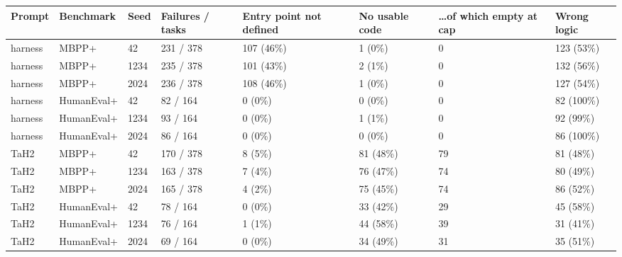 \begin{tabular}{llllllll}
\toprule
Prompt & Benchmark & Seed & Failures / tasks & Entry point not defined & No usable code & …of which empty at cap & Wrong logic \\
\midrule
harness & MBPP+ & 42 & 231 / 378 & 107 (46\%) & 1 (0\%) & 0 & 123 (53\%) \\
harness & MBPP+ & 1234 & 235 / 378 & 101 (43\%) & 2 (1\%) & 0 & 132 (56\%) \\
harness & MBPP+ & 2024 & 236 / 378 & 108 (46\%) & 1 (0\%) & 0 & 127 (54\%) \\
harness & HumanEval+ & 42 & 82 / 164 & 0 (0\%) & 0 (0\%) & 0 & 82 (100\%) \\
harness & HumanEval+ & 1234 & 93 / 164 & 0 (0\%) & 1 (1\%) & 0 & 92 (99\%) \\
harness & HumanEval+ & 2024 & 86 / 164 & 0 (0\%) & 0 (0\%) & 0 & 86 (100\%) \\
TaH2 & MBPP+ & 42 & 170 / 378 & 8 (5\%) & 81 (48\%) & 79 & 81 (48\%) \\
TaH2 & MBPP+ & 1234 & 163 / 378 & 7 (4\%) & 76 (47\%) & 74 & 80 (49\%) \\
TaH2 & MBPP+ & 2024 & 165 / 378 & 4 (2\%) & 75 (45\%) & 74 & 86 (52\%) \\
TaH2 & HumanEval+ & 42 & 78 / 164 & 0 (0\%) & 33 (42\%) & 29 & 45 (58\%) \\
TaH2 & HumanEval+ & 1234 & 76 / 164 & 1 (1\%) & 44 (58\%) & 39 & 31 (41\%) \\
TaH2 & HumanEval+ & 2024 & 69 / 164 & 0 (0\%) & 34 (49\%) & 31 & 35 (51\%) \\
\bottomrule
\end{tabular}
